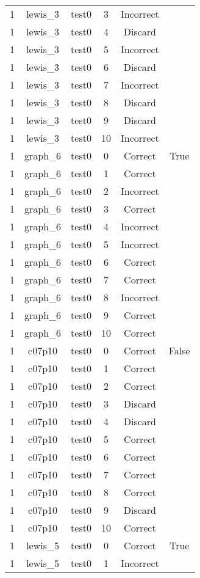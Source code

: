 \begin{longtable}{|c|c|c|c|c|c|}
1 & lewis\_3 & test0 & 3 & Incorrect &  \\ 
1 & lewis\_3 & test0 & 4 & Discard &  \\ 
1 & lewis\_3 & test0 & 5 & Incorrect &  \\ 
1 & lewis\_3 & test0 & 6 & Discard &  \\ 
1 & lewis\_3 & test0 & 7 & Incorrect &  \\ 
1 & lewis\_3 & test0 & 8 & Discard &  \\ 
1 & lewis\_3 & test0 & 9 & Discard &  \\ 
1 & lewis\_3 & test0 & 10 & Incorrect &  \\ 
1 & graph\_6 & test0 & 0 & Correct & True \\ 
1 & graph\_6 & test0 & 1 & Correct &  \\ 
1 & graph\_6 & test0 & 2 & Incorrect &  \\ 
1 & graph\_6 & test0 & 3 & Correct &  \\ 
1 & graph\_6 & test0 & 4 & Incorrect &  \\ 
1 & graph\_6 & test0 & 5 & Incorrect &  \\ 
1 & graph\_6 & test0 & 6 & Correct &  \\ 
1 & graph\_6 & test0 & 7 & Correct &  \\ 
1 & graph\_6 & test0 & 8 & Incorrect &  \\ 
1 & graph\_6 & test0 & 9 & Correct &  \\ 
1 & graph\_6 & test0 & 10 & Correct &  \\ 
1 & c07p10 & test0 & 0 & Correct & False \\ 
1 & c07p10 & test0 & 1 & Correct &  \\ 
1 & c07p10 & test0 & 2 & Correct &  \\ 
1 & c07p10 & test0 & 3 & Discard &  \\ 
1 & c07p10 & test0 & 4 & Discard &  \\ 
1 & c07p10 & test0 & 5 & Correct &  \\ 
1 & c07p10 & test0 & 6 & Correct &  \\ 
1 & c07p10 & test0 & 7 & Correct &  \\ 
1 & c07p10 & test0 & 8 & Correct &  \\ 
1 & c07p10 & test0 & 9 & Discard &  \\ 
1 & c07p10 & test0 & 10 & Correct &  \\ 
1 & lewis\_5 & test0 & 0 & Correct & True \\ 
1 & lewis\_5 & test0 & 1 & Incorrect &  \\ 

\end{longtable}
